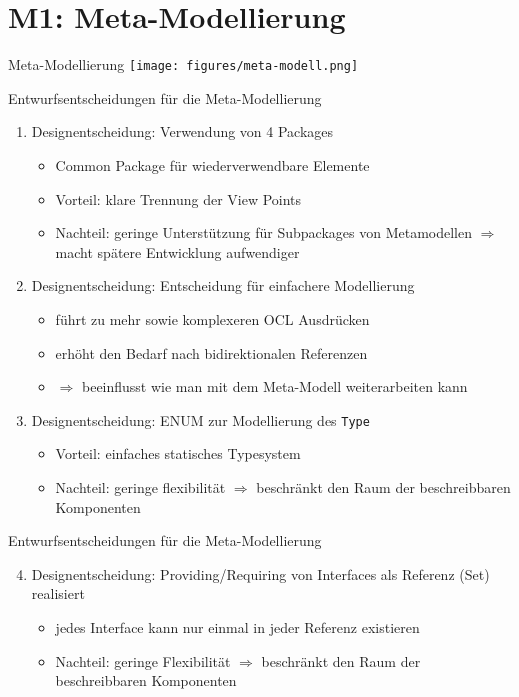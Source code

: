 \section[M1: Metamodell]{M1: Meta-Modellierung}
\begin{frame}{Meta-Modellierung}
	\centering
	\texttt{[image: figures/meta-modell.png]}
\end{frame}

\begin{frame}{Entwurfsentscheidungen für die Meta-Modellierung}
	\begin{enumerate}
		\item Designentscheidung: Verwendung von 4 Packages
		\begin{itemize}
			\item Common Package für wiederverwendbare Elemente
			\item Vorteil: klare Trennung der View Points
			\item Nachteil: geringe Unterstützung für Subpackages von Metamodellen $\Rightarrow$ macht spätere Entwicklung aufwendiger
		\end{itemize}
		\item Designentscheidung: Entscheidung für einfachere Modellierung
		\begin{itemize}
			\item führt zu mehr sowie komplexeren OCL Ausdrücken
			\item erhöht den Bedarf nach bidirektionalen Referenzen
			\item $\Rightarrow$ beeinflusst wie man mit dem Meta-Modell weiterarbeiten kann
		\end{itemize}
		\item Designentscheidung: ENUM zur Modellierung des \texttt{Type}
		\begin{itemize}
			\item Vorteil: einfaches statisches Typesystem
			\item Nachteil: geringe flexibilität $\Rightarrow$ beschränkt den Raum der beschreibbaren Komponenten
		\end{itemize}
	\end{enumerate}
\end{frame}

\begin{frame}{Entwurfsentscheidungen für die Meta-Modellierung}
	\begin{enumerate}
		\setcounter{enumi}{3}
		\item Designentscheidung: Providing/Requiring von Interfaces als Referenz (Set) realisiert
		\begin{itemize}
			\item jedes Interface kann nur einmal in jeder Referenz existieren
			\item Nachteil: geringe Flexibilität $\Rightarrow$ beschränkt den Raum der beschreibbaren Komponenten
		\end{itemize}
	\end{enumerate}
\end{frame}